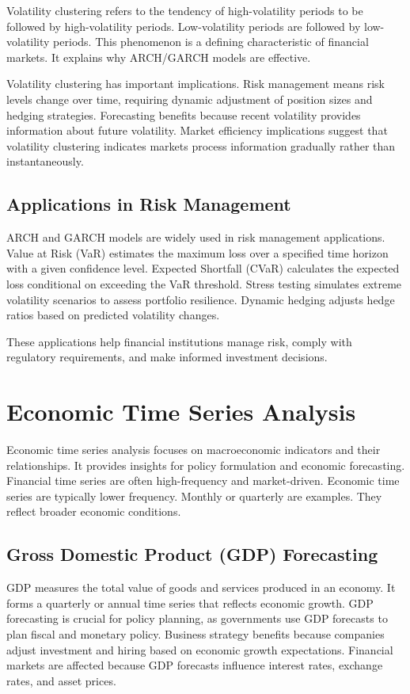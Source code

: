 Volatility clustering refers to the tendency of high-volatility periods to be followed by high-volatility periods. Low-volatility periods are followed by low-volatility periods. This phenomenon is a defining characteristic of financial markets. It explains why ARCH/GARCH models are effective.

Volatility clustering has important implications. Risk management means risk levels change over time, requiring dynamic adjustment of position sizes and hedging strategies. Forecasting benefits because recent volatility provides information about future volatility. Market efficiency implications suggest that volatility clustering indicates markets process information gradually rather than instantaneously.

\subsection{Applications in Risk Management}

ARCH and GARCH models are widely used in risk management applications. Value at Risk (VaR) estimates the maximum loss over a specified time horizon with a given confidence level. Expected Shortfall (CVaR) calculates the expected loss conditional on exceeding the VaR threshold. Stress testing simulates extreme volatility scenarios to assess portfolio resilience. Dynamic hedging adjusts hedge ratios based on predicted volatility changes.

These applications help financial institutions manage risk, comply with regulatory requirements, and make informed investment decisions.

\section{Economic Time Series Analysis}

Economic time series analysis focuses on macroeconomic indicators and their relationships. It provides insights for policy formulation and economic forecasting. Financial time series are often high-frequency and market-driven. Economic time series are typically lower frequency. Monthly or quarterly are examples. They reflect broader economic conditions.

\subsection{Gross Domestic Product (GDP) Forecasting}

GDP measures the total value of goods and services produced in an economy. It forms a quarterly or annual time series that reflects economic growth. GDP forecasting is crucial for policy planning, as governments use GDP forecasts to plan fiscal and monetary policy. Business strategy benefits because companies adjust investment and hiring based on economic growth expectations. Financial markets are affected because GDP forecasts influence interest rates, exchange rates, and asset prices.

